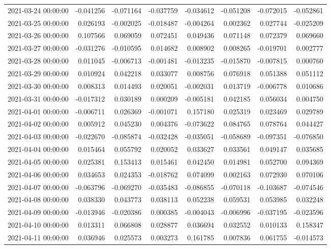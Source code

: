 \begin{tabular}{lrrrrrrr}
2021-03-24 00:00:00 & -0.041256 & -0.071164 & -0.037759 & -0.034612 & -0.051208 & -0.072015 & -0.052861 \\
2021-03-25 00:00:00 & 0.026193 & -0.002025 & -0.018487 & -0.004264 & 0.002362 & 0.027744 & -0.025209 \\
2021-03-26 00:00:00 & 0.107566 & 0.069059 & 0.072451 & 0.049436 & 0.071148 & 0.072379 & 0.069660 \\
2021-03-27 00:00:00 & -0.031276 & -0.010595 & 0.014682 & 0.008902 & 0.008265 & -0.019701 & 0.002777 \\
2021-03-28 00:00:00 & 0.011045 & -0.006713 & -0.001481 & -0.013235 & -0.015870 & -0.007815 & 0.000760 \\
2021-03-29 00:00:00 & 0.010924 & 0.042218 & 0.033077 & 0.008756 & 0.076918 & 0.051388 & 0.051112 \\
2021-03-30 00:00:00 & 0.008313 & 0.014493 & 0.020051 & -0.002031 & 0.013719 & -0.006778 & 0.010686 \\
2021-03-31 00:00:00 & -0.017312 & 0.030189 & 0.000209 & -0.005181 & 0.042185 & 0.056034 & 0.004750 \\
2021-04-01 00:00:00 & -0.006711 & 0.026369 & -0.001071 & 0.157180 & 0.025319 & 0.023469 & 0.029789 \\
2021-04-02 00:00:00 & 0.005912 & 0.045230 & 0.004376 & -0.073622 & 0.084765 & 0.078764 & 0.044427 \\
2021-04-03 00:00:00 & -0.022670 & -0.085874 & -0.032428 & -0.035051 & -0.058689 & -0.097351 & -0.076850 \\
2021-04-04 00:00:00 & 0.015464 & 0.055792 & 0.020052 & 0.033627 & 0.033561 & 0.049147 & 0.035685 \\
2021-04-05 00:00:00 & 0.025381 & 0.153413 & 0.015461 & 0.042450 & 0.014981 & 0.052700 & 0.094369 \\
2021-04-06 00:00:00 & 0.034653 & 0.024353 & -0.018762 & 0.074099 & 0.002163 & 0.072930 & 0.070106 \\
2021-04-07 00:00:00 & -0.063796 & -0.069270 & -0.035483 & -0.086855 & -0.070118 & -0.103687 & -0.074546 \\
2021-04-08 00:00:00 & 0.038330 & 0.043773 & 0.038113 & 0.052238 & 0.059531 & 0.053985 & 0.032248 \\
2021-04-09 00:00:00 & -0.013946 & -0.020386 & 0.000385 & -0.004043 & -0.006996 & -0.037195 & -0.023596 \\
2021-04-10 00:00:00 & 0.013311 & 0.066808 & 0.028877 & 0.036694 & 0.032552 & 0.010133 & 0.158347 \\
2021-04-11 00:00:00 & 0.036946 & 0.025573 & 0.003273 & 0.161785 & 0.007836 & 0.061755 & -0.014573 \\

\end{tabular}
